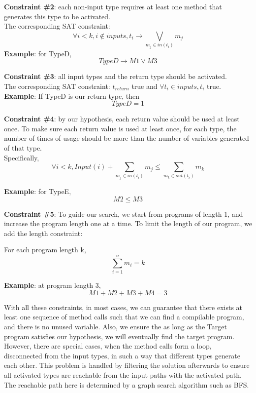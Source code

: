 \documentclass[twocolumn]{article}
\begin{document}
\textbf{Constraint \#2}: each non-input type requires at least one method that generates this type to be activated.\\
The corresponding SAT constraint: $$\forall i < k, i \notin inputs, t_i \rightarrow \bigvee_{m_j \in in(t_i)} m_j$$
\textbf{Example}: for TypeD, $$TypeD \rightarrow M1 \vee M3$$

\textbf{Constraint \#3}: all input types and the return type should be activated. \\
The corresponding SAT constraint: $t_{return}$ true and $\forall t_i \in inputs, t_i$ true.\\

\textbf{Example}: If TypeD is our return type, then $$TypeD = 1$$


\textbf{Constraint \#4}: by our hypothesis, each return value should be used at least once. To make sure each return value is used at least once, for each type, the number of times of usage should be more than the number of variables generated of that type.\\
Specifically, $$\forall i < k, Input(i) + \sum_{m_j \in in(t_i)}m_j \leqslant \sum_{m_k \in out(t_i)}m_k$$ 

\textbf{Example}: for TypeE, $$M2 \leqslant M3$$

\textbf{Constraint \#5}: To guide our search, we start from programs of length 1, and increase the program length one at a time. To limit the length of our program, we add the length constraint:

For each program length k, $$\sum_{i=1}^{n} m_i = k$$

\textbf{Example}: at program length 3, $$M1+M2+M3+M4 = 3$$

With all these constraints, in most cases, we can guarantee that there exists at least one sequence of method calls such that we can find a compilable program, and there is no unused variable. Also, we ensure the as long as the Target program satisfies our hypothesis, we will eventually find the target program.\\ 

However, there are special cases, when the method calls form a loop, disconnected from the input types, in such a way that different types generate each other. This problem is handled by filtering the solution afterwards to ensure all activated types are reachable from the input paths with the activated path. The reachable path here is determined by a graph search algorithm such as BFS.\\
\end{document}

